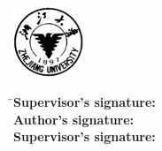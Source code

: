 
\newpage
\thispagestyle{empty}

\vspace{5mm}

\begin{center}
\xunderline[115mm]{\linespread{1.1}\xiaoer\TNR\bfseries\centerline\zjutitlee}
\ifthenelse{\equal\zjutitleeb{}}{}{\\[2mm]\xunderline[115mm]{\linespread{1.1}\xiaoer\Fangsong\bfseries\centerline\zjutitleeb}}
\ifthenelse{\equal\zjutitleec{}}{}{\\[2mm]\xunderline[115mm]{\linespread{1.1}\xiaoer\Fangsong\bfseries\centerline\zjutitleec}}
\end{center}

\vspace{5mm}

\begin{center}
  \includegraphics[width=21mm]{images/standxb.png}
\end{center}

\vspace{-6mm}

\begin{tabbing}
\hspace{20mm} \= \sanhao\bfseries Supervisor's signature: \= \underline{\makebox[5cm]{}}\kill \\
              \> \hspace{7mm} \sanhao\bfseries Author's signature: \> \underline{\makebox[5cm]{}} \\[5mm]
              \> \sanhao\bfseries Supervisor's signature: \> \underline{\makebox[5cm]{}}
\end{tabbing}

\vspace{8mm}

